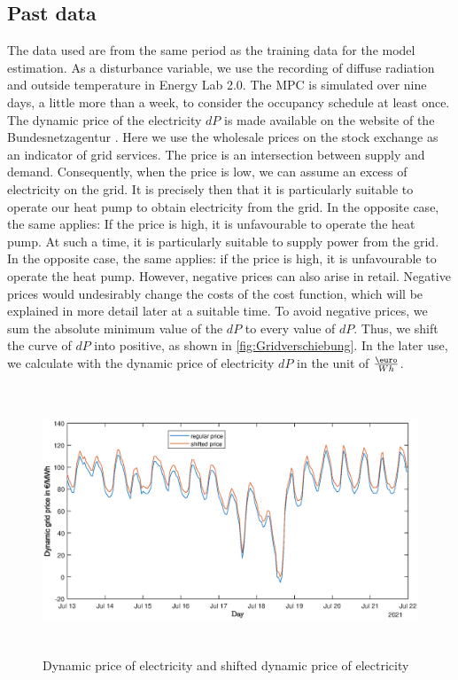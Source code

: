 \subsection{Past data}
\label{subsec:PastData}
    The data used are from the same period as the training data for the model estimation. As a disturbance variable, we use the recording of diffuse radiation and outside temperature in Energy Lab 2.0. The MPC is simulated over nine days, a little more than a week, to consider the occupancy schedule at least  once.\newline
    The dynamic price of the electricity  $dP$ is made available on the website of the Bundesnetzagentur \cite{Bundesnetzagentur-smard}. Here we use the wholesale prices on the stock exchange as an indicator of grid services. The price is an intersection between supply and demand. Consequently, when the price is low, we can assume an excess of electricity on the grid. It is precisely then that it is particularly suitable to operate our heat pump to obtain electricity from the grid. In the opposite case, the same applies: If the price is high, it is unfavourable to operate the heat pump. At such a time, it is particularly suitable to supply power from the grid. In the opposite case, the same applies: if the price is high, it is unfavourable to operate the heat pump. \newline
    However, negative prices can also arise in retail. Negative prices would undesirably change the costs of the cost function, which will be explained in more detail later at a suitable time. To avoid negative prices, we sum the absolute minimum value of the $dP$ to every value of $dP$. Thus, we shift the curve of $dP$ into positive, as shown in \autoref{fig:Gridverschiebung}. In the later use, we calculate with the dynamic price of electricity $dP$ in the unit of $\frac{\text{\euro}}{Wh}$.
    \begin{figure}[h]
            \centering
            \includegraphics[width=15cm,height=8cm]{figure/Grid_data_Verschiebung.eps}
           \caption{Dynamic price of electricity \cite{Bundesnetzagentur-smard} and shifted dynamic price of electricity}
            \label{fig:Gridverschiebung}
    \end{figure}
    
